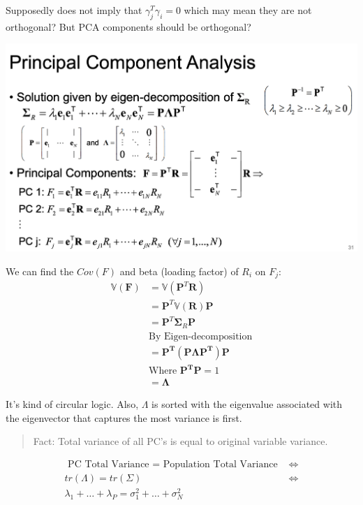 \documentclass[
  oneside]{book}
\begin{document}
Supposedly does not imply that \(\gamma_{j}^{T}\gamma_{i} = 0\) which may mean they are not orthogonal? But PCA components should be orthogonal?

\includegraphics{Notes/Obsidian-Attachments/5-Factor-Models.png}

We can find the \(Cov(F)\) and beta (loading factor) of \(R_i\) on \(F_j\):
\[
\begin{aligned}
\mathbb{V}(\mathbf{F})&= \mathbb{V}(\mathbf{P}^{T}\mathbf{R})\\
&= \mathbf{P}^{T}\mathbb{V}(\mathbf{R})\mathbf{P}\\
&= \mathbf{P}^{T}\boldsymbol{\Sigma}_{R}\mathbf{P}\\
&\text{By Eigen-decomposition}\\
&= \mathbf{P^{T}(P\Lambda P^{T})P}\\
&\text{Where } \mathbf{P^{T}P} = 1\\
&= \boldsymbol{\Lambda}
\end{aligned} 
\]

It's kind of circular logic. Also, \(\Lambda\) is sorted with the eigenvalue associated with the eigenvector that captures the most variance is first.

\begin{quote}
Fact: Total variance of all PC's is equal to original variable variance.
\end{quote}

\[
\begin{aligned}
\text{ PC Total Variance = Population Total Variance } &\iff\\
tr(\Lambda) = tr(\Sigma) &\iff\\
\lambda_{1}+\dots+\lambda_{P} = \sigma_{1}^{2}+\dots+\sigma^{2}_{N}
\end{aligned}
\]
\end{document}
